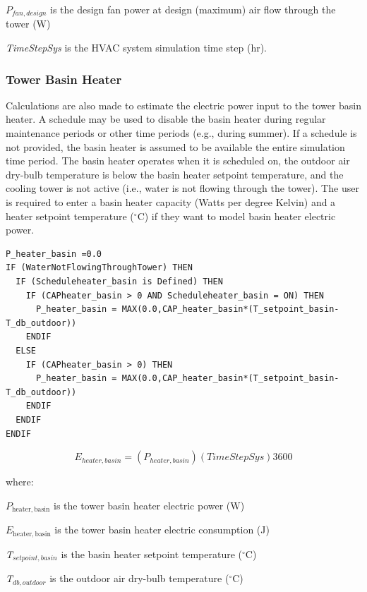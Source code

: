 \({P_{fan,design}}\) is the design fan power at design (maximum) air flow through the tower (W)

\emph{TimeStepSys} is the HVAC system simulation time step (hr).

\subsubsection{Tower Basin Heater}\label{tower-basin-heater-1}

Calculations are also made to estimate the electric power input to the tower basin heater. A schedule may be used to disable the basin heater during regular maintenance periods or other time periods (e.g., during summer). If a schedule is not provided, the basin heater is assumed to be available the entire simulation time period. The basin heater operates when it is scheduled on, the outdoor air dry-bulb temperature is below the basin heater setpoint temperature, and the cooling tower is not active (i.e., water is not flowing through the tower). The user is required to enter a basin heater capacity (Watts per degree Kelvin) and a heater setpoint temperature (\(^{\circ}\)C) if they want to model basin heater electric power.

\begin{lstlisting}
P_heater_basin =0.0
IF (WaterNotFlowingThroughTower) THEN
  IF (Scheduleheater_basin is Defined) THEN
    IF (CAPheater_basin > 0 AND Scheduleheater_basin = ON) THEN
      P_heater_basin = MAX(0.0,CAP_heater_basin*(T_setpoint_basin-T_db_outdoor))
    ENDIF
  ELSE
    IF (CAPheater_basin > 0) THEN
      P_heater_basin = MAX(0.0,CAP_heater_basin*(T_setpoint_basin-T_db_outdoor))
    ENDIF
  ENDIF
ENDIF
\end{lstlisting}

\begin{equation}
{E_{heater,basin}} = \left( {P_{heater,basin}} \right)\left( {TimeStepSys} \right) {3600}
\end{equation}

where:

\({P_{{\mathrm{heater,basin}}}}\) is the tower basin heater electric power (W)

\({E_{{\mathrm{heater,basin}}}}\) is the tower basin heater electric consumption (J)

\emph{T\(_{setpoint,basin}\)} is the basin heater setpoint temperature (\(^{\circ}\)C)

\emph{T\(_{db,outdoor}\)} is the outdoor air dry-bulb temperature (\(^{\circ}\)C)

